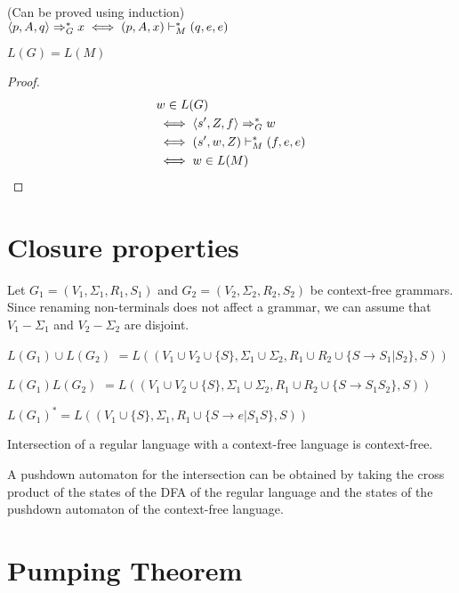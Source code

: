 \begin{lemma}(Can be proved using induction)\\
$\langle p, A, q \rangle \Rightarrow_{G}^* x \iff (p, A, x) \vdash_M^* (q, e, e)$
\end{lemma}
\begin{theorem}$L(G) = L(M)$\end{theorem}
\begin{proof}
\begin{align*}
& w \in L(G)
\\ &\iff \langle s', Z, f \rangle \Rightarrow_{G}^* w
\\ &\iff (s', w, Z) \vdash_M^* (f, e, e)
\\ &\iff w \in L(M)
\end{align*}
\end{proof}

\section{Closure properties}

Let $G_1 = (V_1, \Sigma_1, R_1, S_1)$ and $G_2 = (V_2, \Sigma_2, R_2, S_2)$
be context-free grammars. Since renaming non-terminals does not affect a grammar,
we can assume that $V_1 - \Sigma_1$ and $V_2 - \Sigma_2$ are disjoint.

$L(G_1) \cup L(G_2)$
$= L((V_1 \cup V_2 \cup \{S\}, \Sigma_1 \cup \Sigma_2,
R_1 \cup R_2 \cup \{S \rightarrow S_1 | S_2 \}, S))$

$L(G_1)L(G_2)$
$= L((V_1 \cup V_2 \cup \{S\}, \Sigma_1 \cup \Sigma_2,
R_1 \cup R_2 \cup \{S \rightarrow S_1S_2 \}, S))$

$L(G_1)^* = L((V_1 \cup \{S\}, \Sigma_1,
R_1 \cup \{S \rightarrow e | S_1S \}, S))$

\begin{theorem}
Intersection of a regular language with a context-free language is context-free.
\end{theorem}
A pushdown automaton for the intersection can be obtained by taking the
cross product of the states of the DFA of the regular language
and the states of the pushdown automaton of the context-free language.

\section{Pumping Theorem}

